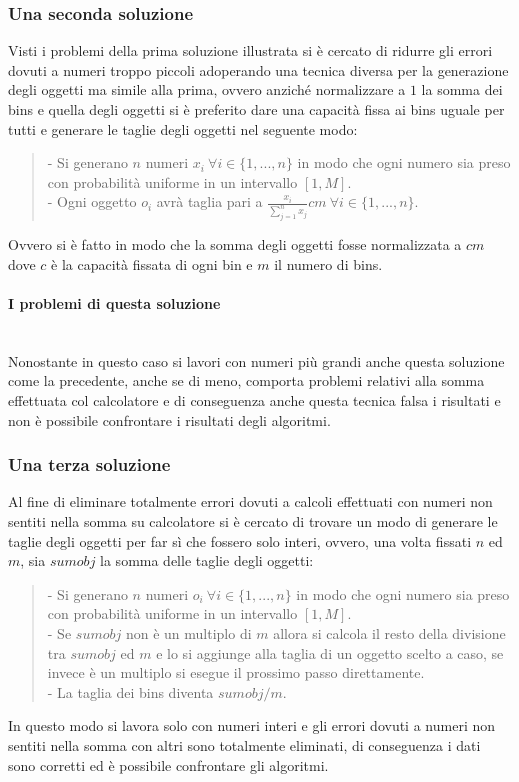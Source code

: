 \subsubsection{Una seconda soluzione}
Visti i problemi della prima soluzione illustrata si è cercato di ridurre gli errori dovuti a numeri troppo piccoli adoperando
una tecnica diversa per la generazione degli oggetti ma simile alla prima, ovvero anziché normalizzare a $ 1 $ la somma dei bins 
e quella degli oggetti si è preferito dare una capacità fissa ai bins uguale per tutti e generare le taglie degli oggetti nel
seguente modo:
\begin{quote}
	- Si generano $ n $ numeri $ x_i \: \forall i \in \{1, ..., n\} $ in modo che ogni numero sia preso con probabilità 
	uniforme in un intervallo $ [1, M] $. \\
	- Ogni oggetto $ o_i $ avrà taglia pari a $ \displaystyle\frac{x_i}{\sum_{j=1}^n x_j}cm \: \forall i \in \{1, ..., n\} $. 
\end{quote}
Ovvero si è fatto in modo che la somma degli oggetti fosse normalizzata a $ cm $ dove $ c $ è la capacità fissata
di ogni bin e $ m $ il numero di bins.

\paragraph{I problemi di questa soluzione}\mbox{}\\
Nonostante in questo caso si lavori con numeri più grandi anche questa soluzione come la precedente, anche se di meno, comporta problemi relativi
alla somma effettuata col calcolatore e di conseguenza anche questa tecnica falsa i risultati e non è possibile confrontare
i risultati degli algoritmi.


\subsubsection{Una terza soluzione}
Al fine di eliminare totalmente errori dovuti a calcoli effettuati con numeri non sentiti nella somma su calcolatore 
si è cercato di trovare un modo di generare le taglie degli oggetti per far sì che fossero solo interi, ovvero, una volta fissati 
$ n $ ed $ m $, sia $ sumobj $ la somma delle taglie degli oggetti:
\begin{quote}
	- Si generano $ n $ numeri $ o_i \: \forall i \in \{1, ..., n\} $ in modo che ogni numero sia preso con probabilità
	uniforme in un intervallo $ [1, M] $.\\
	- Se $ sumobj $  non è un multiplo di $ m $ allora si calcola il resto della divisione tra $ sumobj $ ed $ m $ e lo 
	si aggiunge alla taglia di un oggetto scelto a caso, se invece è un multiplo si esegue il prossimo passo direttamente.\\
	- La taglia dei bins diventa $ sumobj/m $.
\end{quote}
In questo modo si lavora solo con numeri interi e gli errori dovuti a numeri non sentiti nella somma con altri sono totalmente
eliminati, di conseguenza i dati sono corretti ed è possibile confrontare gli algoritmi.


